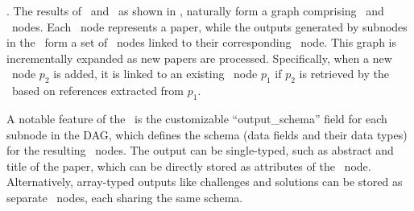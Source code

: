 

. The results of \inspector\ and \navigator\, as shown in , naturally form a graph comprising \fact\ and \dimension\ nodes. Each \fact\ node represents a paper, while the outputs generated by subnodes in the \inspector\ form a set of \dimension\ nodes linked to their corresponding \fact\ node.
This graph is incrementally expanded as new papers are processed. Specifically, when a new \fact\ node $p_2$ is added, it is linked to an existing \fact\ node $p_1$ if $p_2$ is retrieved by the \navigator\ based on references extracted from $p_1$.

A notable feature of the \inspector\ is the customizable “output\_schema” field for each subnode in the DAG, which defines the schema (data fields and their data types) for the resulting \dimension\ nodes.
The output can be single-typed, such as abstract and title of the paper, which can be directly stored as attributes of the \fact\ node. Alternatively, array-typed outputs like challenges and solutions can be stored as separate \dimension\ nodes, each sharing the same schema.

